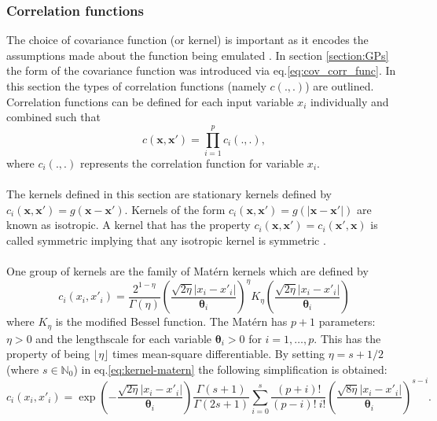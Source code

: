 \documentclass{article}
\newcommand{\floor}[1]{\lfloor #1 \rfloor}
\newcommand{\numInputs}{p}
\newcommand{\inputVec}{\mathbf{x}}
\newcommand{\inputVal}{x}
\newcommand{\corr}{c}
\newcommand{\corrXi}{c_i}
\newcommand{\lengthscale}{\mathbf{\theta}}
\begin{document}
\subsubsection{Correlation functions}
The choice of covariance function (or kernel) is important as it encodes the assumptions made about the function being emulated \citep{Rasmussen_Williams_2006}. In section \ref{section:GPs} the form of the covariance function was introduced via eq.\eqref{eq:cov_corr_func}. In this section the types of correlation functions (namely $\corr(.,.)$) are outlined. Correlation functions can be defined for each input variable $\inputVal_i$ individually and combined such that
\begin{equation}
    \label{eq:kernel-product}
    \corr(\inputVec,\inputVec') = \prod_{i=1}^\numInputs \corrXi(.,.),
\end{equation}
where $\corrXi(.,.)$ represents the correlation function for variable $\inputVal_i$.\\\\
The kernels defined in this section are stationary kernels defined by $\corrXi(\inputVec,\inputVec') = g(\inputVec-\inputVec')$. Kernels of the form $\corrXi(\inputVec,\inputVec') = g(|\inputVec-\inputVec'|)$ are known as isotropic. A kernel that has the property $\corrXi(\inputVec,\inputVec') = \corrXi(\inputVec',\inputVec)$ is called symmetric implying that any isotropic kernel is symmetric \citep{Rasmussen_Williams_2006}.\\\\
One group of kernels are the family of Mat{\'e}rn kernels \citep{Matern1947} which are defined by
\begin{equation}
    \label{eq:kernel-matern}
    \corrXi(\inputVal_i,\inputVal'_i) = \frac{2^{1-\eta}}{\Gamma(\eta)} \left(\frac{\sqrt{2 \eta} |\inputVal_i - \inputVal'_i|}{\lengthscale_i} \right)^\eta K_\eta \left(\frac{\sqrt{2 \eta} |\inputVal_i - \inputVal'_i|}{\lengthscale_i} \right)
\end{equation}
where $K_\eta$ is the modified Bessel function. The Mat{\'e}rn has $\numInputs+1$ parameters: $\eta>0$ and the lengthscale for each variable $\lengthscale_i > 0$ for $i = 1,\dots,\numInputs$. This has the property of being $\floor{\eta}$ times mean-square differentiable. By setting $\eta = s + 1/2$ (where $s \in \mathbb{N}_0$) in eq.\eqref{eq:kernel-matern} the following simplification is obtained:
\begin{equation}
    \nonumber
    \corrXi(\inputVal_i,\inputVal'_i) = \exp{\left(-\frac{\sqrt{2 \eta}|\inputVal_i - \inputVal'_i|}{\lengthscale_i} \right)} \frac{\Gamma(s + 1)}{\Gamma(2s + 1)} \sum_{i=0}^s \frac{(\numInputs+i)!}{(\numInputs-i)!\ i!} \left(\frac{\sqrt{8\eta} |\inputVal_i - \inputVal'_i|}{\lengthscale_i} \right)^{s-i}.
\end{equation}
\end{document}
